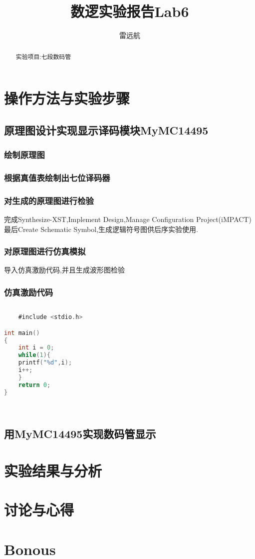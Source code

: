 \documentclass{article}
\title{数逻实验报告Lab6}
\author{雷远航}
\begin{document}
\maketitle

\begin{abstract}
    实验项目:七段数码管
\end{abstract}

\section{操作方法与实验步骤}

\subsection{原理图设计实现显示译码模块MyMC14495}
\subsubsection{绘制原理图}
\subsubsection*{根据真值表绘制出七位译码器}
    

\subsubsection{对生成的原理图进行检验}
完成Synthesize-XST,Implement Design,Manage Configuration Project(iMPACT)
最后Create Schematic Symbol,生成逻辑符号图供后序实验使用.

\subsubsection{对原理图进行仿真模拟}
导入仿真激励代码,并且生成波形图检验
\subsubsection*{仿真激励代码}

\begin{lstlisting}[language=C]
   
    #include <stdio.h>

int main()
{
	int i = 0;
	while(1){
	printf("%d",i);
	i++;
	}
	return 0;
}

    
\end{lstlisting}



\subsection{用MyMC14495实现数码管显示}

\section{实验结果与分析}

\section{讨论与心得}

\section{Bonous}
\end{document}
